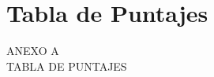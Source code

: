 
{
\Hide
\chapter{Tabla de Puntajes}
}

\begin{titular} 
	\uppercase{
	Anexo A \\
	Tabla de Puntajes \\
	}
\end{titular}


